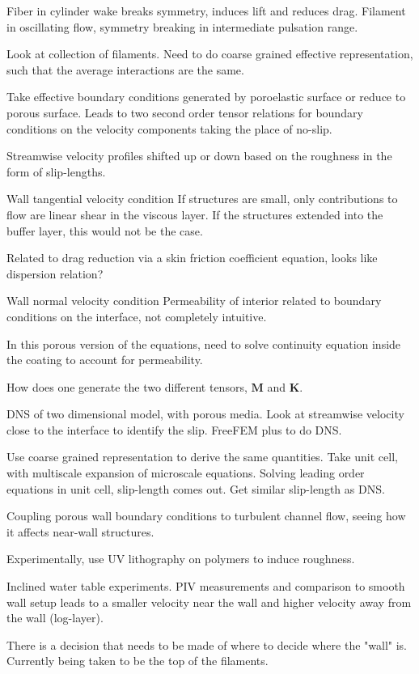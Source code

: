 \begin{description}
{\begin{description}
Fiber in cylinder wake breaks symmetry, induces lift and reduces drag.
Filament in oscillating flow, symmetry breaking in intermediate pulsation range.

Look at collection of filaments. Need to do coarse grained effective representation,
such that the average interactions are the same.

Take effective boundary conditions generated by poroelastic surface or reduce to
porous surface. Leads to two second order tensor relations for boundary
conditions on the velocity components taking the place of no-slip.

Streamwise velocity profiles shifted up or down based on the roughness in
the form of slip-lengths.

Wall tangential velocity condition
If structures are small, only contributions to flow are linear shear in the
viscous layer. If the structures extended into the buffer layer, this would
not be the case.

Related to drag reduction via a skin friction coefficient equation, looks like
dispersion relation?

Wall normal velocity condition
Permeability of interior related to boundary conditions on the interface, not
completely intuitive.

In this porous version of the equations, need to solve continuity equation
inside the coating to account for permeability.

How does one generate the two different tensors, $\mathbf{M}$ and $\mathbf{K}$.

DNS of two dimensional model, with porous media. Look at streamwise velocity
close to the interface to identify the slip. FreeFEM plus to do DNS.

Use coarse grained representation to derive the same quantities.
Take unit cell, with multiscale expansion of microscale equations.
Solving leading order equations in unit cell, slip-length comes out. Get
similar slip-length as DNS.

Coupling porous wall boundary conditions to turbulent channel flow, seeing
how it affects near-wall structures.

Experimentally, use UV lithography on polymers to induce roughness.

Inclined water table experiments. PIV measurements and comparison
to smooth wall setup leads to a smaller velocity near the wall and
higher velocity away from the wall (log-layer).

There is a decision that needs to be made of where to decide where the "wall"
is. Currently being taken to be the top of the filaments.


\end{description}}
\end{description}
